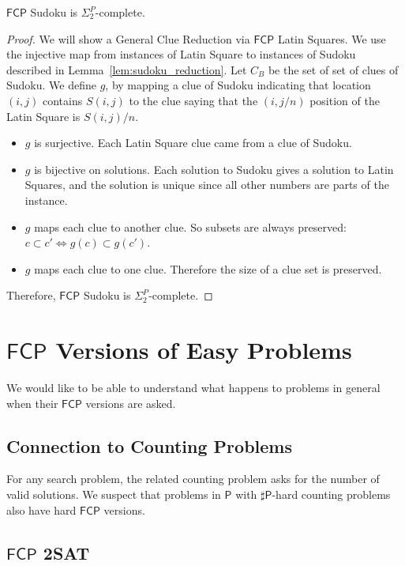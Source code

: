 \documentclass[runningheads,a4paper]{llncs}
\begin{document}
\begin{lemma} 
$\mathsf{FCP}$ Sudoku is $\Sigma_2^P$-complete.
\end{lemma}

\begin{proof} 
We will show a General Clue Reduction via $\mathsf{FCP}$ Latin Squares. We use the injective map from instances of Latin Square to instances of Sudoku described in Lemma~\ref{lem:sudoku_reduction}. Let $C_B$ be the set of set of clues of Sudoku. We define $g$, by mapping a clue of Sudoku indicating that location $(i,j)$ contains $S(i,j)$ to the clue saying that the $(i, j/n)$ position of the Latin Square is $S(i, j)/n$. 
\begin{itemize}
\item $g$ is surjective. Each Latin Square clue came from a clue of Sudoku.
\item $g$ is bijective on solutions. Each solution to Sudoku gives a solution to Latin Squares, and the solution is unique since all other numbers are parts of the instance. 
\item $g$ maps each clue to another clue. So subsets are always preserved: $c \subset c' \iff g(c) \subset g(c')$. 
\item $g$ maps each clue to one clue. Therefore the size of a clue set is preserved. 
\end{itemize}
Therefore, $\mathsf{FCP}$ Sudoku is $\Sigma_2^P$-complete. 
\end{proof}

\section{$\mathsf{FCP}$ Versions of Easy Problems}
\label{sec:easyproblems}

We would like to be able to understand what happens to problems in general when their $\mathsf{FCP}$ versions are asked.

\subsection{Connection to Counting Problems}

For any search problem, the related counting problem asks for the number of valid solutions. We suspect that problems in $\mathsf{P}$ with $\sharp \mathsf{P}$-hard counting problems also have hard $\mathsf{FCP}$ versions.

\subsection{$\mathsf{FCP}$ 2SAT} 
\end{document}
